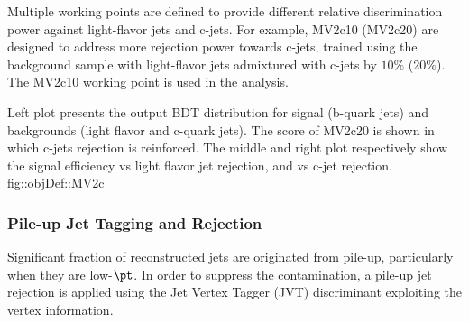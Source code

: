 Multiple working points are defined to provide different relative discrimination power against light-flavor jets and c-jets.
For example, MV2c10 (MV2c20) are designed to address more rejection power towards c-jets, trained using the background sample with light-flavor jets admixtured with c-jets by $10\%$ ($20\%$). 
The MV2c10 working point is used in the analysis.






{Left plot presents the output BDT distribution for signal (b-quark jets) and backgrounds (light flavor and c-quark jets). The score of MV2c20 is shown in which c-jets rejection is reinforced.  The middle and right plot respectively show the signal efficiency vs light flavor jet rejection, and vs c-jet rejection.
 \cite{150_bTag_Run2_exp}}
{fig::objDef::MV2c}




\subsubsection{Pile-up Jet Tagging and Rejection} \label{sec::objDef::jets::JVT}
\newcommand{\pv}{\mathrm{PV}}
\newcommand{\pttk}{\pt^{\mathrm{trk}_k}}
\newcommand{\pttl}{\pt^{\mathrm{trk}_l}}
Significant fraction of reconstructed jets are originated from pile-up, particularly when they are low-$\pt$.
In order to suppress the contamination, a pile-up jet rejection is applied using the Jet Vertex Tagger (JVT) discriminant \cite{155_JVT} exploiting the vertex information.  \\

